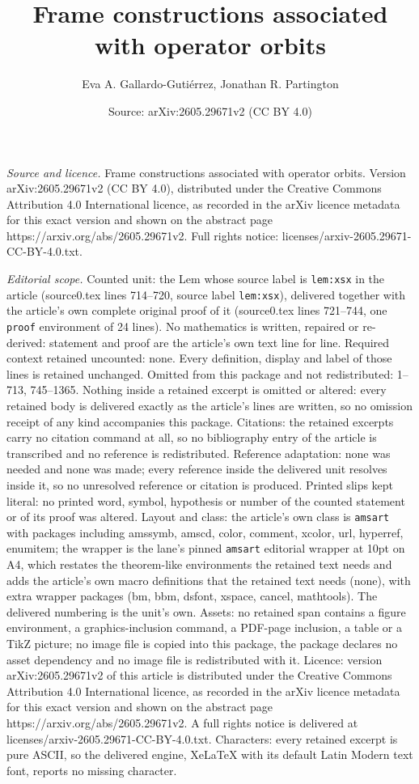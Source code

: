\documentclass[10pt,a4paper]{amsart}
\title[Frame constructions associated with operator orbits]{Frame constructions associated with operator orbits}
\author{Eva A. Gallardo-Guti\'errez, Jonathan R. Partington}
\date{Source: arXiv:2605.29671v2 (CC BY 4.0)}
\begin{document}
\maketitle

\noindent\emph{Source and licence.} Frame constructions associated with operator orbits. Version arXiv:2605.29671v2 (CC BY 4.0), distributed under the Creative Commons Attribution 4.0 International licence, as recorded in the arXiv licence metadata for this exact version and shown on the abstract page https://arxiv.org/abs/2605.29671v2. Full rights notice: licenses/arxiv-2605.29671-CC-BY-4.0.txt.\par\smallskip

\noindent\textit{Editorial scope.} Counted unit: the Lem whose source label is \texttt{lem:xsx} in the article (source0.tex lines 714--720, source label \texttt{lem:xsx}), delivered together with the article's own complete original proof of it (source0.tex lines 721--744, one \texttt{proof} environment of 24 lines). No mathematics is written, repaired or re-derived: statement and proof are the article's own text line for line. Required context retained uncounted: none. Every definition, display and label of those lines is retained unchanged. Omitted from this package and not redistributed: 1--713, 745--1365. Nothing inside a retained excerpt is omitted or altered: every retained body is delivered exactly as the article's lines are written, so no omission receipt of any kind accompanies this package. Citations: the retained excerpts carry no citation command at all, so no bibliography entry of the article is transcribed and no reference is redistributed. Reference adaptation: none was needed and none was made; every reference inside the delivered unit resolves inside it, so no unresolved reference or citation is produced. Printed slips kept literal: no printed word, symbol, hypothesis or number of the counted statement or of its proof was altered. Layout and class: the article's own class is \texttt{amsart} with packages including amssymb, amscd, color, comment, xcolor, url, hyperref, enumitem; the wrapper is the lane's pinned \texttt{amsart} editorial wrapper at 10pt on A4, which restates the theorem-like environments the retained text needs and adds the article's own macro definitions that the retained text needs (none), with extra wrapper packages (bm, bbm, dsfont, xspace, cancel, mathtools). The delivered numbering is the unit's own. Assets: no retained span contains a figure environment, a graphics-inclusion command, a PDF-page inclusion, a table or a TikZ picture; no image file is copied into this package, the package declares no asset dependency and no image file is redistributed with it. Licence: version arXiv:2605.29671v2 of this article is distributed under the Creative Commons Attribution 4.0 International licence, as recorded in the arXiv licence metadata for this exact version and shown on the abstract page https://arxiv.org/abs/2605.29671v2. A full rights notice is delivered at licenses/arxiv-2605.29671-CC-BY-4.0.txt. Characters: every retained excerpt is pure ASCII, so the delivered engine, XeLaTeX with its default Latin Modern text font, reports no missing character.
\end{document}
